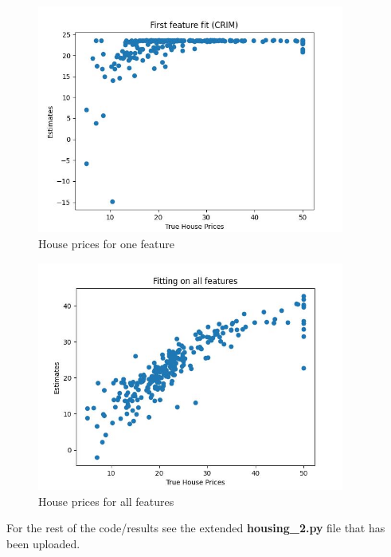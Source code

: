 \begin{figure}[H]
    \centering
    \includegraphics[width=0.9\textwidth]{Figures/Fit_one_feature.JPG}
    \caption{House prices for one feature}
\end{figure}

\begin{figure}[H]
    \centering
    \includegraphics[width=0.9\textwidth]{Figures/fit_all_features.JPG}
    \caption{House prices for all features}
\end{figure}
For the rest of the code/results see the extended \textbf{housing\_2.py} file that has been uploaded.